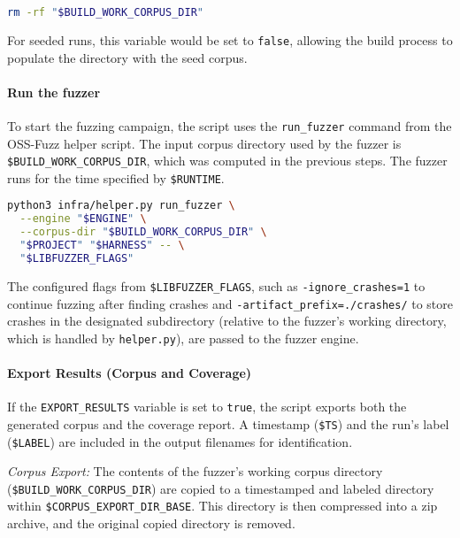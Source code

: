 \documentclass[11pt,a4paper,twocolumn]{article}
\begin{document}
\begin{lstlisting}[language=bash, caption=Bash command to remove the build-time corpus directory for unseeded runs]
rm -rf "$BUILD_WORK_CORPUS_DIR"
\end{lstlisting}

For seeded runs, this variable would be set to \texttt{false}, allowing the build process to populate the directory with the seed corpus.

\noindent \paragraph{Run the fuzzer} \label{sec:methodology_run}

To start the fuzzing campaign, the script uses the \texttt{run\_fuzzer} command from the OSS-Fuzz helper script. The input corpus directory used by the fuzzer is \texttt{\$BUILD\_WORK\_CORPUS\_DIR}, which was computed in the previous steps. The fuzzer runs for the time specified by \texttt{\$RUNTIME}.

\begin{lstlisting}[language=bash, caption=Bash command to run a single fuzzing campaign leveraging OSS-Fuzz helper script]
python3 infra/helper.py run_fuzzer \
  --engine "$ENGINE" \
  --corpus-dir "$BUILD_WORK_CORPUS_DIR" \
  "$PROJECT" "$HARNESS" -- \
  "$LIBFUZZER_FLAGS"
\end{lstlisting}

The configured flags from \texttt{\$LIBFUZZER\_FLAGS}, such as \texttt{-ignore\_crashes=1} to continue fuzzing after finding crashes and \texttt{-artifact\_prefix=./crashes/} to store crashes in the designated subdirectory (relative to the fuzzer's working directory, which is handled by \texttt{helper.py}), are passed to the fuzzer engine.

\noindent \paragraph{Export Results (Corpus and Coverage)} \label{sec:methodology_export}

If the \texttt{EXPORT\_RESULTS} variable is set to \texttt{true}, the script exports both the generated corpus and the coverage report. A timestamp (\texttt{\$TS}) and the run's label (\texttt{\$LABEL}) are included in the output filenames for identification.

\emph{Corpus Export:} The contents of the fuzzer's working corpus directory (\texttt{\$BUILD\_WORK\_CORPUS\_DIR}) are copied to a timestamped and labeled directory within \texttt{\$CORPUS\_EXPORT\_DIR\_BASE}. This directory is then compressed into a zip archive, and the original copied directory is removed.
\end{document}
